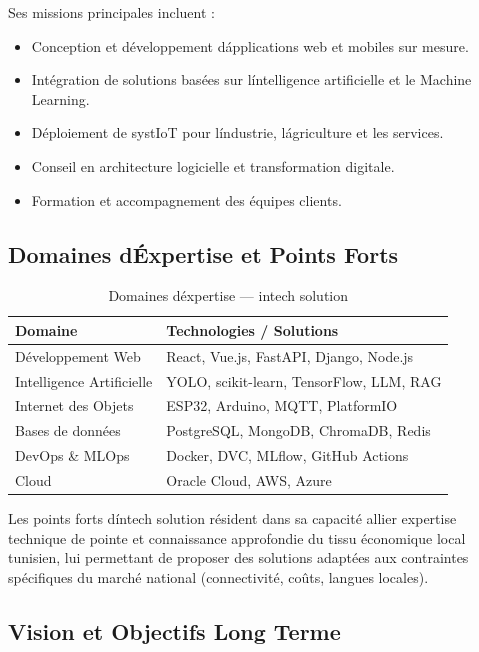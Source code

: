 \documentclass[12pt,a4paper,oneside]{report}
\begin{document}
Ses missions principales incluent :
\begin{itemize}
  \item Conception et d\'eveloppement d\'applications web et mobiles sur mesure.
  \item Int\'egration de solutions bas\'ees sur l\'intelligence artificielle et le Machine Learning.
  \item D\'eploiement de syst\emes IoT pour l\'industrie, l\'agriculture et les services.
  \item Conseil en architecture logicielle et transformation digitale.
  \item Formation et accompagnement des \'equipes clients.
\end{itemize}

\subsection{Domaines d\'Expertise et Points Forts}

\begin{table}[H]\centering
\caption{Domaines d\'expertise --- intech solution}
\label{tab:intech_expertise}
\begin{tabular}{ll}
\toprule
\textbf{Domaine} & \textbf{Technologies / Solutions} \\
\midrule
D\'eveloppement Web      & React, Vue.js, FastAPI, Django, Node.js \\
Intelligence Artificielle & YOLO, scikit-learn, TensorFlow, LLM, RAG \\
Internet des Objets      & ESP32, Arduino, MQTT, PlatformIO \\
Bases de donn\'ees        & PostgreSQL, MongoDB, ChromaDB, Redis \\
DevOps \& MLOps           & Docker, DVC, MLflow, GitHub Actions \\
Cloud                    & Oracle Cloud, AWS, Azure \\
\bottomrule
\end{tabular}
\end{table}

Les points forts d\'intech solution r\'esident dans sa capacit\'e \ allier expertise
technique de pointe et connaissance approfondie du tissu \'economique local tunisien,
lui permettant de proposer des solutions adapt\'ees aux contraintes sp\'ecifiques du march\'e
national (connectivit\'e, co\^uts, langues locales).

\subsection{Vision et Objectifs \ Long Terme}
\end{document}
